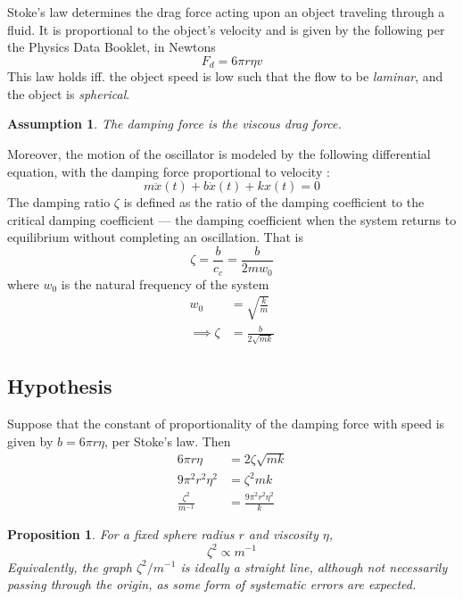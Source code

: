 \documentclass[a4paper,12pt]{article}
\newtheorem{proposition}{Proposition}
\newtheorem{assumption}{Assumption}
\begin{document}
Stoke's law determines the drag force acting upon an object traveling through a fluid. It is proportional to the object's velocity and is given by the following per the Physics Data Booklet, in Newtons
$$F_d = 6\pi r \eta v $$
This law holds iff. the object speed is low such that the flow to be \textit{laminar}, and the object is \textit{spherical}.

\begin{assumption}
  \label{as:1}
  The damping force is the viscous drag force.
\end{assumption}

Moreover, the motion of the oscillator is modeled by the following differential equation, with the damping force proportional to velocity \parencite{miller_2004_13}:
\begin{equation}
  \label{eq:1}
  m\ddot{x}(t) + b\dot{x}(t) + kx(t) = 0
\end{equation}
The damping ratio $\zeta$ is defined as the ratio of the damping coefficient to the critical damping coefficient --- the damping coefficient when the system returns to equilibrium without completing an oscillation. That is $$\zeta = \frac{b}{c_c} = \frac{b}{2mw_0}$$
where $w_0$ is the natural frequency of the system
\begin{align*}
  w_0            & = \sqrt{\frac{k}{m}}   \\
  \implies \zeta & = \frac{b}{2\sqrt{mk}}
\end{align*}

\subsection{Hypothesis}

Suppose that the constant of proportionality of the damping force with speed is given by $b = 6\pi r \eta$, per Stoke's law. Then
\begin{align*}
  6\pi r \eta            & = 2\zeta \sqrt{mk}            \\
  9\pi^2 r^2 \eta^2      & = \zeta^2mk                   \\
  \frac{\zeta^2}{m^{-1}} & = \frac{9\pi^2 r^2 \eta^2}{k}
\end{align*}
\begin{proposition}
  \label{prop:1}
  For a fixed sphere radius $r$ and viscosity $\eta$, \begin{equation}\label{eq:2}
    \zeta^2 \propto m^{-1}
  \end{equation}
  Equivalently, the graph $\zeta^2/m^{-1}$ is ideally a straight line, although not necessarily passing through the origin, as some form of systematic errors are expected.
\end{proposition}
\end{document}
